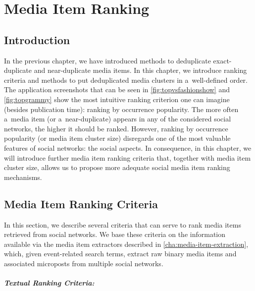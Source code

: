 \chapter{Media Item Ranking}
\label{cha:media-item-ranking}

\ifpdf
    \graphicspath{{8_media_item_ranking/figures/PNG/}{8_media_item_ranking/figures/PDF/}{8_media_item_ranking/figures/}}
\else
    \graphicspath{{8_media_item_ranking/figures/EPS/}{8_media_item_ranking/figures/}}
\fi

\section{Introduction}

In the previous chapter, we have introduced methods
to deduplicate exact-duplicate and near-duplicate media items.
In this chapter, we introduce ranking criteria and methods
to put deduplicated media clusters in a~well-defined order.
The application screenshots that can be seen in \autoref{fig:topvsfashionshow}
and \autoref{fig:topgrammy} show the
most intuitive ranking criterion one can imagine (besides publication time):
ranking by occurrence popularity.
The more often a~media item (or a~near-duplicate)
appears in any of the considered social networks, 
the higher it should be ranked.
However, ranking by occurrence popularity (or media item cluster size)
disregards one of the most valuable features of social networks: 
the social aspects.
In consequence, in this chapter, we will introduce
further media item ranking criteria that,
together with media item cluster size,
allows us to propose more adequate social media item ranking mechanisms.

\section{Media Item Ranking Criteria}

In this section, we describe several criteria that can serve to rank
media items retrieved from social networks. 
We base these criteria on the information available via
the media item extractors described in \autoref{cha:media-item-extraction},
which, given event-related search terms,
extract raw binary media items and associated microposts
from multiple social networks.

\paragraph{Textual Ranking Criteria:}

